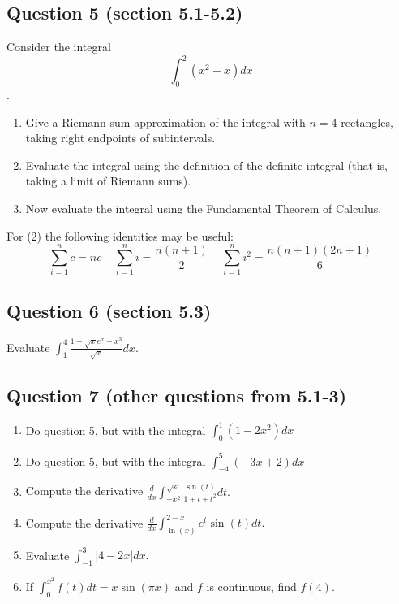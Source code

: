 \documentclass[12pt]{amsart}
\theoremstyle{plain}
\theoremstyle{definition}
\begin{document}
\subsection*{Question 5 (section 5.1-5.2)}
Consider the integral \[\int_{0}^2(x^2 + x)dx\].
\begin{enumerate}
    \item Give a Riemann sum approximation of the integral with $n=4$ rectangles, taking right endpoints of subintervals.\vspace{3cm}
    \item Evaluate the integral using the definition of the definite integral (that is, taking a limit of Riemann sums).\vspace{3cm}
    \item Now evaluate the integral using the Fundamental Theorem of Calculus.\vspace{3cm}
\end{enumerate}
\vspace{1cm}

For (2) the following identities may be useful: \[\sum_{i=1}^n c = nc \ \ \ \ \ \sum_{i=1}^n i = \frac{n(n + 1)}{2} \ \ \ \ \ \sum_{i=1}^n i^2 = \frac{n(n + 1)(2n + 1)}{6}\]




\vspace{1cm}



\subsection*{Question 6 (section 5.3)}
Evaluate $\displaystyle \int_1^4 \frac{1 + \sqrt{x}e^x - x^3}{\sqrt{x}}dx$.\vspace{3cm}




\vspace{1cm}


\subsection*{Question 7 (other questions from 5.1-3)}
\begin{enumerate}
    \item Do question 5, but with the integral \(\displaystyle\int_{0}^1(1 - 2x^2)dx\)\vspace{4cm}
    \item Do question 5, but with the integral \(\displaystyle\int_{-4}^{5}(-3x + 2)dx\)\vspace{4cm}
    \item Compute the derivative \(\displaystyle\frac{d}{dx}\int_{-x^2}^{\sqrt{x}}\frac{\sin(t)}{1 + t + t^2}dt.\)\vspace{4cm}
    \item Compute the derivative \(\displaystyle\frac{d}{dx}\int_{\ln(x)}^{2 - x}e^t\sin(t)dt.\)\vspace{4cm}
    \item Evaluate \(\displaystyle \int_{-1}^3 |4 - 2x|dx.\)\vspace{4cm}
    \item If $\displaystyle \int_0^{x^2}f(t)dt=x\sin(\pi x)$ and $f$ is continuous, find $f(4)$.
\end{enumerate}\newpage
\end{document}
